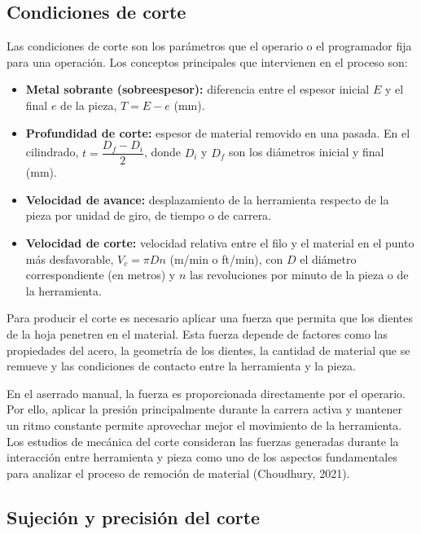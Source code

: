 \documentclass[12pt,a4paper]{article}
\begin{document}
\subsection{Condiciones de corte}

Las condiciones de corte son los parámetros que el operario o el programador
fija para una operación. Los conceptos principales que intervienen en el proceso
son:

\vspace{2pt}

\begin{itemize}
	\item \textbf{Metal sobrante (sobreespesor):} diferencia entre el espesor
	      inicial $E$ y el final $e$ de la pieza, $T=E-e$ (mm).
	\item \textbf{Profundidad de corte:} espesor de material removido en una
	      pasada. En el cilindrado, $t=\dfrac{D_f-D_i}{2}$, donde $D_i$ y $D_f$
	      son
	      los diámetros inicial y final (mm).
	\item \textbf{Velocidad de avance:} desplazamiento de la herramienta respecto
	      de la pieza por unidad de giro, de tiempo o de carrera.
	\item \textbf{Velocidad de corte:} velocidad relativa entre el filo y el
	      material en el punto más desfavorable, $V_c=\pi D n$ (m/min o ft/min),
	      con $D$ el diámetro correspondiente (en metros) y $n$ las revoluciones
	      por
	      minuto de la pieza o de la herramienta.
\end{itemize}

Para producir el corte es necesario aplicar una fuerza que permita que los
dientes de la hoja penetren en el material. Esta fuerza depende de factores como
las propiedades del acero, la geometría de los dientes, la cantidad de material
que se remueve y las condiciones de contacto entre la herramienta y la pieza.

\vspace{6pt}

En el aserrado manual, la fuerza es proporcionada directamente por el operario.
Por ello, aplicar la presión principalmente durante la carrera activa y mantener
un ritmo constante permite aprovechar mejor el movimiento de la herramienta. Los
estudios de mecánica del corte consideran las fuerzas generadas durante la
interacción entre herramienta y pieza como uno de los aspectos fundamentales
para analizar el proceso de remoción de material (Choudhury, 2021).

\subsection{Sujeción y precisión del corte}
\end{document}
